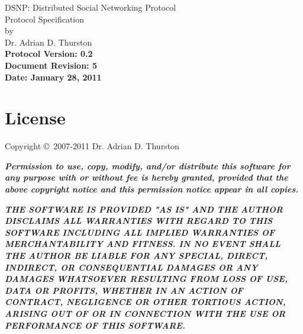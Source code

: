 \documentclass[letterpaper,11pt,oneside]{article}
\begin{document}
%
%

\thispagestyle{empty}
\begin{center}
{\huge DSNP: Distributed Social Networking Protocol}\\
\vspace*{12pt}
{\Large Protocol Specification}\\
\vspace{12pt}
by\\
\vspace{12pt}
{\large Dr. Adrian D. Thurston}\\
\vspace{22pt}
{\noindent\bf\large Protocol Version: 0.2}\\
\vspace{6pt}
{\noindent\bf\large Document Revision: 5}\\
\vspace{6pt}
{\noindent\bf\large Date: January 28, 2011}
\end{center}


\vspace{1.3in}

\section*{License}

Copyright \copyright\ 2007-2011 Dr. Adrian D. Thurston

\vspace{5pt}

{\bf\it\noindent Permission to use, copy, modify, and/or distribute this
software for any purpose with or without fee is hereby granted, provided that
the above copyright notice and this permission notice appear in all copies.}

\vspace{5pt}

{\bf\it\noindent
THE SOFTWARE IS PROVIDED "AS IS" AND THE AUTHOR DISCLAIMS ALL WARRANTIES
WITH REGARD TO THIS SOFTWARE INCLUDING ALL IMPLIED WARRANTIES OF
MERCHANTABILITY AND FITNESS. IN NO EVENT SHALL THE AUTHOR BE LIABLE FOR
ANY SPECIAL, DIRECT, INDIRECT, OR CONSEQUENTIAL DAMAGES OR ANY DAMAGES
WHATSOEVER RESULTING FROM LOSS OF USE, DATA OR PROFITS, WHETHER IN AN
ACTION OF CONTRACT, NEGLIGENCE OR OTHER TORTIOUS ACTION, ARISING OUT OF
OR IN CONNECTION WITH THE USE OR PERFORMANCE OF THIS SOFTWARE.}

\vspace{1.5in}
\end{document}
